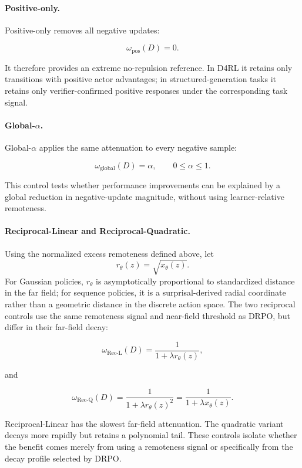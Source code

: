 \documentclass{article}
\theoremstyle{plain}
\theoremstyle{definition}
\theoremstyle{remark}
\begin{document}
\paragraph{Positive-only.}

Positive-only removes all negative updates:

\[
\omega_{\mathrm{pos}}(D)=0.
\]

It therefore provides an extreme no-repulsion reference. In D4RL it
retains only transitions with positive actor advantages; in
structured-generation tasks it retains only verifier-confirmed positive
responses under the corresponding task signal.

\paragraph{Global-\(\alpha\).}

Global-\(\alpha\) applies the same attenuation to every negative sample:

\[
\omega_{\mathrm{global}}(D)=\alpha,
\qquad
0\leq\alpha\leq 1.
\]

This control tests whether performance improvements can be explained by
a global reduction in negative-update magnitude, without using
learner-relative remoteness.

\paragraph{Reciprocal-Linear and Reciprocal-Quadratic.}
Using the normalized excess remoteness defined above, let
\[
r_\theta(z)=\sqrt{x_\theta(z)}.
\]
For Gaussian policies, \(r_\theta\) is asymptotically proportional to
standardized distance in the far field; for sequence policies, it is a
surprisal-derived radial coordinate rather than a geometric distance in
the discrete action space.
The two reciprocal controls use the same remoteness signal and
near-field threshold as DRPO, but differ in their far-field decay:

\[
\omega_{\mathrm{Rec\text{-}L}}(D)
=
\frac{1}{1+\lambda r_\theta(z)},
\]

and

\[
\omega_{\mathrm{Rec\text{-}Q}}(D)
=
\frac{1}{1+\lambda r_\theta(z)^2}
=
\frac{1}{1+\lambda x_\theta(z)}.
\]

Reciprocal-Linear has the slowest far-field attenuation. The quadratic
variant decays more rapidly but retains a polynomial tail. These
controls isolate whether the benefit comes merely from using a
remoteness signal or specifically from the decay profile selected by
DRPO.
\end{document}
